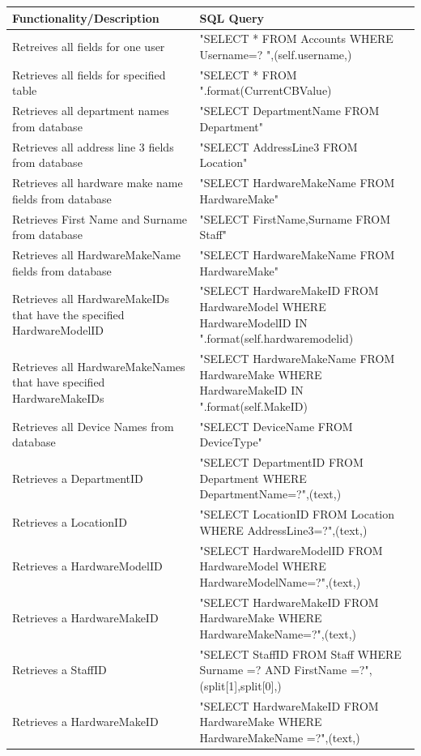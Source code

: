 \begin{center}
    \begin{longtable}{|p{5cm}|p{7cm}|}
    \hline
	\textbf{Functionality/Description} & \textbf{SQL Query} \\ \hline

Retreives all fields for one user & "SELECT * FROM Accounts WHERE Username=? ",(self.username,) \\ \hline
Retrieves all fields for specified table & "SELECT * FROM {}".format(CurrentCBValue) \\ \hline
Retrieves all department names from database & "SELECT DepartmentName FROM Department" \\ \hline
Retrieves all address line 3 fields from database & "SELECT AddressLine3 FROM Location" \\ \hline
Retrieves all hardware make name fields  from database & "SELECT HardwareMakeName FROM HardwareMake" \\ \hline
Retrieves First Name and Surname from database & "SELECT FirstName,Surname FROM Staff" \\ \hline
Retrieves all HardwareMakeName fields from database & "SELECT HardwareMakeName FROM HardwareMake"  \\ \hline
Retrieves all HardwareMakeIDs that have the specified HardwareModelID & "SELECT HardwareMakeID FROM HardwareModel WHERE HardwareModelID IN {}".format(self.hardwaremodelid) \\ \hline
Retrieves all HardwareMakeNames that have specified HardwareMakeIDs & "SELECT HardwareMakeName FROM HardwareMake WHERE HardwareMakeID IN {}".format(self.MakeID) \\ \hline
Retrieves all Device Names from database & "SELECT DeviceName FROM DeviceType" \\ \hline
Retrieves a DepartmentID & "SELECT DepartmentID FROM Department WHERE DepartmentName=?",(text,) \\ \hline
Retrieves a LocationID & "SELECT LocationID FROM Location WHERE AddressLine3=?",(text,) \\ \hline
Retrieves a HardwareModelID &"SELECT HardwareModelID FROM HardwareModel WHERE HardwareModelName=?",(text,) \\ \hline
Retrieves a HardwareMakeID & "SELECT HardwareMakeID FROM HardwareMake WHERE HardwareMakeName=?",(text,) \\ \hline
Retrieves a StaffID & "SELECT StaffID FROM Staff WHERE Surname =? AND FirstName =?",(split[1],split[0],) \\ \hline
Retrieves a HardwareMakeID & "SELECT HardwareMakeID FROM HardwareMake WHERE HardwareMakeName =?",(text,) \\ \hline

\end{longtable}
\end{center}
